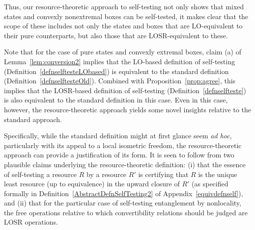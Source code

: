 \documentclass[12pt]{article}
\theoremstyle{plain}
\theoremstyle{definition}
\begin{document}
Thus, our resource-theoretic approach to self-testing not only shows that mixed states and convexly nonextremal boxes can be self-tested, it makes clear that the scope of these includes not only the states and boxes that are LO-equivalent to their pure counterparts, but also those that are LOSR-equivalent to these. 


Note that for the case of pure states and convexly extremal boxes, claim (a) of Lemma~\ref{lem:conversion2} implies that the LO-based definition of self-testing (Definition~\ref{defnselftesteLObased}) is equivalent to the standard definition (Definition~\ref{defnselftesteOld}).  Combined with Proposition~\ref{prop:agree}, this implies that the LOSR-based definition of self-testing (Definition~\ref{defnselfteste}) is also equivalent to the standard definition in this case.  Even in this case, however, the resource-theoretic approach yields some novel insights relative to the standard approach. 



Specifically, while the standard definition might at first glance seem {\em ad hoc}, particularly with its appeal to a local isometric freedom, the resource-theoretic approach can provide a justification of its form.
It is seen to follow from two plausible claims underlying the resource-theoretic definition: (i) that 
  the essence of self-testing a resource $R$ by a resource $R'$ is certifying that $R$ is the unique least resource (up to equivalence) in the upward closure of $R'$
(as specified formally in Definition~\ref{AbstractDefnSelfTesting2} of Appendix~\ref{equivdefnself}),
  and (ii)    that for the particular case of self-testing entanglement by nonlocality,
the free operations relative to which convertibility relations should be judged are LOSR operations.
\end{document}
